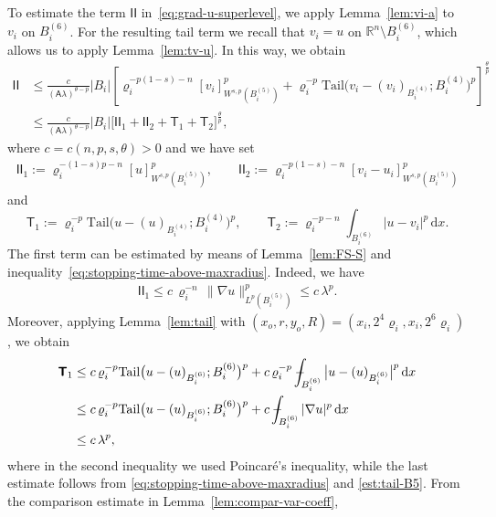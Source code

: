 \documentclass[10pt,letterpaper]{amsart}
\theoremstyle{definition}
\numberwithin{theorem}{section}
\numberwithin{equation}{section}
\newcommand{\R}{\ensuremath{\mathbb{R}}}
\newcommand{\mint}{- \mskip-19,5mu \int}
\newcommand{\1}{\ensuremath{\mathds{1}}}
\newcommand{\dx}{\mathrm{d}x}
\newcommand\sfI{{\boldsymbol{\mathsf I}}}
\newcommand\sfT{{\boldsymbol{\mathsf T}}}
\renewcommand{\rho}{\varrho}
\renewcommand{\rho}{\varrho}
\numberwithin{equation}{section}
\begin{document}
To estimate the term $\sfI\sfI$ in~\eqref{eq:grad-u-superlevel}, we apply
Lemma~\ref{lem:vi-a} to $v_i$ on $B_i^{(6)}$. For the resulting tail term we recall that
$v_i=u$ on $\R^n \setminus B_i^{(6)}$, which allows us to apply
Lemma~\ref{lem:tv-u}. In this way, we obtain
\begin{align*}
    \sfI\sfI 
    &\leq 
    \frac{c }{(\mathsf A\lambda)^{\theta-p}}  |B_i|
    \left[ \rho_i^{-p(1-s) - n} [v_i]_{W^{s,p}(B_i^{(5)})}^p + 
    \rho_i^{-p}\mathrm{Tail} \big(v_i-(v_i)_{B_i^{(4)}}; B_i^{(4)}\big)^p \right]^\frac{\theta}{p} \\
    &\leq 
    \frac{c}{(\mathsf A\lambda)^{\theta-p}}|B_i| \big[ 
    \sfI\sfI_1 + 
    \sfI\sfI_2 + 
    \sfT_1 + \sfT_2 \big]^\frac{\theta}{p}, 
\end{align*}
where $c = c(n,p,s,\theta)> 0$ and we have set 
\begin{align*}
    \sfI\sfI_1
    :=
    \rho_i^{-(1-s)p-n} [u]_{W^{s,p}(B_i^{(5)})}^p ,
    \qquad 
    \sfI\sfI_2
    :=
    \rho_i^{-p(1-s)-n} [v_i-u_i]_{W^{s,p}(B_i^{(5)})}^p
\end{align*}
and 
\begin{equation*}
    \sfT_1
    :=
    \rho_i^{-p}\mathrm{Tail} \big(u-(u)_{B_i^{(4)}}; B_i^{(4)}\big)^p,
    \qquad
    \sfT_2
    :=
    \rho_i^{-p-n} \int_{B_i^{(6)}} |u-v_i|^p \,\dx  .
\end{equation*}
The first term can be estimated by means of Lemma~\ref{lem:FS-S}
and inequality~\eqref{eq:stopping-time-above-maxradius}. Indeed, we have
\begin{align*}
    \sfI\sfI_1
    \le 
    c \,\rho_i^{-n} \, \|\nabla u\|_{L^{p}(B_i^{(5)})}^p
    \le 
    c\,\lambda^p.
\end{align*}
Moreover, applying Lemma~\ref{lem:tail} with
$(x_o,r,y_o,R)=(x_i,2^4\rho_i,x_i,2^6\rho_i)$, we obtain
\begin{align*}
    \sfT_1
    &\le 
    c\, \rho_i^{-p}\mathrm{Tail} \big(u-(u)_{B_i^{(6)}}; B_i^{(6)}\big)^p
    +
    c \,\rho_i^{-p}
    \mint_{B_i^{(6)}} \big|u-(u)_{B_i^{(6)}}\big|^p\,\dx \\
    &\le
    c\, \rho_i^{-p}\mathrm{Tail} \big(u-(u)_{B_i^{(6)}}; B_i^{(6)}\big)^p +
    c \mint_{B_i^{(6)}} |\nabla u|^p\,\dx \\
    &\le 
    c\,\lambda^p ,
\end{align*}
where in the second inequality we used Poincar\'e's inequality,
while the last estimate follows from
\eqref{eq:stopping-time-above-maxradius} and \eqref{est:tail-B5}.
From the comparison estimate in Lemma~\ref{lem:compar-var-coeff},
\end{document}
